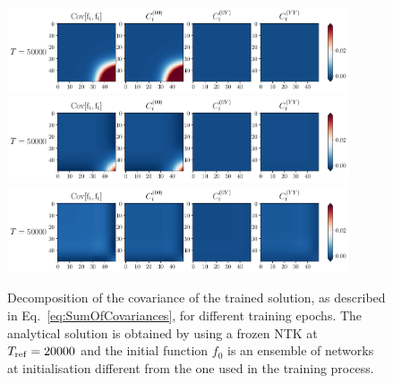 \begin{figure}[ht!]
  \centering
  \includegraphics[width=0.90\textwidth]{plots/analytical_solution/covariance/covariance_ft_0_L0.pdf}
  \includegraphics[width=0.90\textwidth]{plots/analytical_solution/covariance/covariance_ft_1_L0.pdf}
  \includegraphics[width=0.90\textwidth]{plots/analytical_solution/covariance/covariance_ft_100_L0.pdf}
  \caption{Decomposition of the covariance of the trained solution, as
  described in Eq.~\eqref{eq:SumOfCovariances}, for different training epochs.
  The analytical solution is obtained by using a frozen NTK at
  $T_{\rm{ref}}=20000$ and the initial function $f_0$ is an ensemble of
  networks at initialisation different from the one used in the training
  process.}
  \label{fig:analytical_covariance_L0}
\end{figure}
